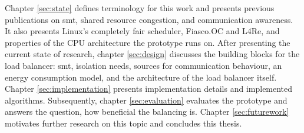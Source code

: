 Chapter \ref{sec:state} defines terminology for this work and presents previous
publications on \gls{smt}, shared resource congestion, and communication awareness.
It also presents Linux's completely fair scheduler, Fiasco.OC and L4Re, and
properties of the CPU architecture the prototype runs on.
After presenting the current state of research, chapter \ref{sec:design} discusses
the building blocks for the load
balancer: \gls{smt}, isolation needs, sources for communication behaviour, an energy
consumption model, and the architecture of the load balancer itself.
Chapter \ref{sec:implementation} presents implementation details and
implemented algorithms.
Subsequently, chapter \ref{sec:evaluation} evaluates the prototype and answers
the question, how beneficial the balancing is.
Chapter \ref{sec:futurework} motivates further research on this topic and
concludes this thesis.


\cleardoublepage

